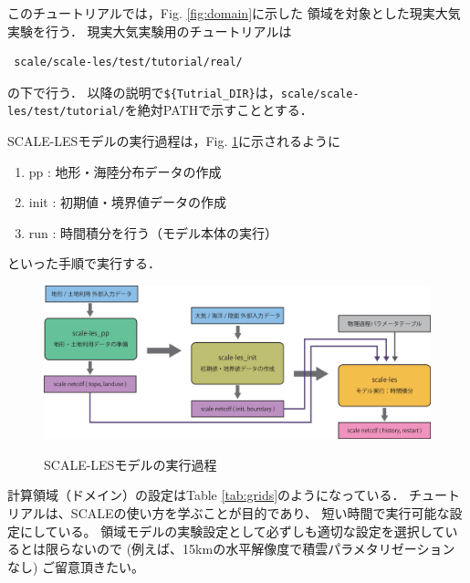 
このチュートリアルでは，Fig. \ref{fig:domain}に示した
領域を対象とした現実大気実験を行う．
現実大気実験用のチュートリアルは
\begin{verbatim}
 scale/scale-les/test/tutorial/real/
\end{verbatim}
の下で行う．
以降の説明で\verb|${Tutrial_DIR}|は，\verb|scale/scale-les/test/tutorial/|を絶対PATHで示すこととする．

SCALE-LESモデルの実行過程は，Fig. \ref{fig:howto}に示されるように
\begin{enumerate}
\item pp : 地形・海陸分布データの作成
\item init : 初期値・境界値データの作成
\item run : 時間積分を行う（モデル本体の実行）
\end{enumerate}
といった手順で実行する．


\begin{figure}[h]
\begin{center}
  \includegraphics[width=0.9\hsize]{./figure/how_to_run.eps}\\
  \caption{SCALE-LESモデルの実行過程}
  \label{fig:howto}
\end{center}
\end{figure}

計算領域（ドメイン）の設定はTable \ref{tab:grids}のようになっている．
チュートリアルは、SCALEの使い方を学ぶことが目的であり、
短い時間で実行可能な設定にしている。
領域モデルの実験設定として必ずしも適切な設定を選択しているとは限らないので
(例えば、15kmの水平解像度で積雲パラメタリゼーションなし)
ご留意頂きたい。

